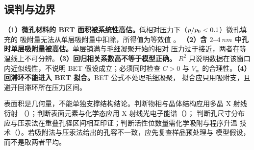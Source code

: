 \subsection{误判与边界}

\begin{pitfall}
\textbf{（1）微孔材料的 BET 面积被系统性高估。}低相对压力下（$p/p_{0}<0.1$）微孔填充的
吸附量无法从单层吸附量中扣除，所得值为等效值 。
\textbf{（2）含 $2$--$\qty{4}{nm}$ 中孔时单层吸附量被高估。}单层铺满与毛细凝聚开始的相对
压力过于接近，两者在等温线上不可分辨。\textbf{（3）回归相关系数高不等于模型正确。}
$R^2$ 只说明数据在该窗口内近似线性，不说明 BET 假设成立；必须同时检查 $C>0$ 与
$V_{\mathrm{m}}$ 的合理性。\textbf{（4）回滞环不能进入 BET 拟合。}BET 公式不处理毛细凝聚，
拟合应只用吸附支，且避开回滞环所在压力区间。
\end{pitfall}

\begin{crosscheck}
表面积是几何量，不能单独支撑结构结论。判断物相与晶体结构应用多晶 X 射线衍射
（）；判断表面元素与化学态应用 X 射线光电子能谱（）；
判断孔尺寸分布应与压汞法在重叠孔径区间相互印证；判断活性位数量需化学吸附与程序升温
技术（）。若吸附法与压汞法给出的孔容不一致，应先复查样品预处理与
模型假设，而不是取两者平均。
\end{crosscheck}


